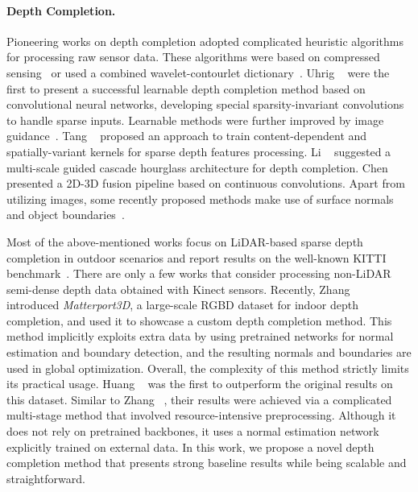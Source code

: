 \documentclass[final]{cvpr}
\begin{document}
    \paragraph{Depth Completion.}
    Pioneering works on depth completion adopted complicated heuristic algorithms for processing raw sensor data. These algorithms were based on compressed sensing~\cite{6126488} or used a combined wavelet-contourlet dictionary~\cite{7055919}.
    Uhrig \etal~\cite{uhrig} were the first to present a successful learnable depth completion method based on convolutional neural networks, developing special sparsity-invariant convolutions to handle sparse inputs. Learnable methods were further improved by image guidance~\cite{cspn, 8757939, Yang_2019_CVPR, 8917294}. Tang \etal~\cite{guidenet} proposed an approach to train content-dependent and spatially-variant kernels for sparse depth features processing. Li \etal~\cite{hourglass} suggested a multi-scale guided cascade hourglass architecture for depth completion. Chen \etal~\cite{uberfusenet} presented a 2D-3D fusion pipeline based on continuous convolutions. Apart from utilizing images, some recently proposed methods make use of surface normals~\cite{deeplidar, Huang_2019, Xu_2019_ICCV, DBLP:journals/corr/abs-1803-09326} and object boundaries~\cite{Huang_2019, DBLP:journals/corr/abs-1803-09326}.
    
    Most of the above-mentioned works focus on LiDAR-based sparse depth completion in outdoor scenarios and report results on the well-known KITTI benchmark~\cite{uhrig}. There are only a few works that consider processing non-LiDAR semi-dense depth data obtained with Kinect sensors. Recently, Zhang \etal~\cite{DBLP:journals/corr/abs-1803-09326} introduced \emph{Matterport3D}, a large-scale RGBD dataset for indoor depth completion, and used it to showcase a custom depth completion method. This method implicitly exploits extra data by using pretrained networks for normal estimation and boundary detection, and the resulting normals and boundaries are used in global optimization. Overall, the complexity of this method strictly limits its practical usage. Huang \etal~\cite{Huang_2019} was the first to outperform the original results on this dataset. Similar to Zhang \etal~\cite{DBLP:journals/corr/abs-1803-09326}, their results were achieved via a complicated multi-stage method that involved resource-intensive preprocessing. Although it does not rely on pretrained backbones, it uses a normal estimation network explicitly trained on external data. In this work, we propose a novel depth completion method that presents strong baseline results while being scalable and straightforward.
    
\end{document}
